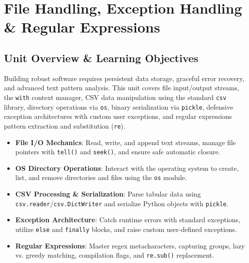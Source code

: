 \chapter{File Handling, Exception Handling \& Regular Expressions}
\label{chap:files-exceptions-regex}

\section{Unit Overview \& Learning Objectives}

\begin{conceptbox}
Building robust software requires persistent data storage, graceful error recovery, and advanced text pattern analysis. This unit covers file input/output streams, the \texttt{with} context manager, CSV data manipulation using the standard \texttt{csv} library, directory operations via \texttt{os}, binary serialization via \texttt{pickle}, defensive exception architectures with custom user exceptions, and regular expressions pattern extraction and substitution (\texttt{re}).
\end{conceptbox}

\begin{itemize}[leftmargin=1.5em]
    \item \textbf{File I/O Mechanics}: Read, write, and append text streams, manage file pointers with \texttt{tell()} and \texttt{seek()}, and ensure safe automatic closure.
    \item \textbf{OS Directory Operations}: Interact with the operating system to create, list, and remove directories and files using the \texttt{os} module.
    \item \textbf{CSV Processing \& Serialization}: Parse tabular data using \texttt{csv.reader}/\texttt{csv.DictWriter} and serialize Python objects with \texttt{pickle}.
    \item \textbf{Exception Architecture}: Catch runtime errors with standard exceptions, utilize \texttt{else} and \texttt{finally} blocks, and raise custom user-defined exceptions.
    \item \textbf{Regular Expressions}: Master regex metacharacters, capturing groups, lazy vs. greedy matching, compilation flags, and \texttt{re.sub()} replacement.
\end{itemize}

